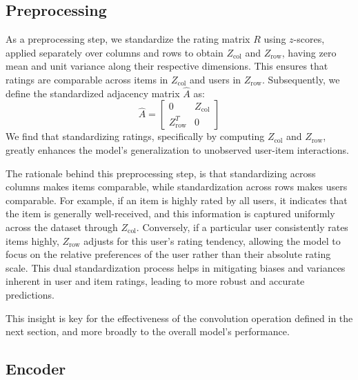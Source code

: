 \documentclass[10pt,conference,compsocconf]{IEEEtran}
\begin{document}
\subsection{Preprocessing}
As a preprocessing step, we standardize the rating matrix $R$ using $z$-scores, applied separately over columns and rows to obtain $Z_{\text{col}}$ and $Z_{\text{row}}$, 
having zero mean and unit variance along their respective dimensions.
This ensures that ratings are comparable across items in $Z_{\text{col}}$ and users in $Z_{\text{row}}$.
Subsequently, we define the standardized adjacency matrix $\hat{A}$ as:
\[
\hat{A} = \begin{bmatrix}
0 & Z_{\text{col}} \\
Z_{\text{row}}^T & 0
\end{bmatrix}
\]
We find that standardizing ratings, specifically by computing $Z_{\text{col}}$ and $Z_{\text{row}}$, greatly enhances the model's generalization to unobserved user-item interactions.

The rationale behind this preprocessing step, is that standardizing across columns makes items comparable, while standardization across rows makes users comparable. 
For example, if an item is highly rated by all users, it indicates that the item is generally well-received, and this information is captured uniformly across the dataset through \( Z_{\text{col}} \). 
Conversely, if a particular user consistently rates items highly, \( Z_{\text{row}} \) adjusts for this user's rating tendency, allowing the model to focus on the relative preferences of the user rather than their absolute rating scale. 
This dual standardization process helps in mitigating biases and variances inherent in user and item ratings, leading to more robust and accurate predictions.

This insight is key for the effectiveness of the convolution operation defined in the next section, and more broadly to the overall model's performance.

\subsection{Encoder}
\end{document}
